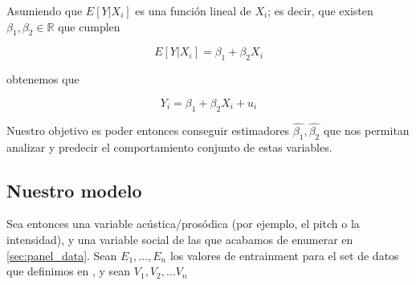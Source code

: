Asumiendo que $E[Y|X_i]$ es una función lineal de $X_i$; es decir, que existen $\beta_1, \beta_2 \in \mathbb{R}$ que cumplen

\begin{equation}
  E[Y|X_i] = \beta_1 + \beta_2 X_i
\end{equation}

obtenemos que

\begin{equation}
  Y_i = \beta_1 + \beta_2 X_i + u_i
\end{equation}

Nuestro objetivo es poder entonces conseguir estimadores $\widehat{\beta_1}, \widehat{\beta_2}$ que nos permitan analizar y predecir el comportamiento conjunto de estas variables.

\subsection{Nuestro modelo}



Sea entonces una variable acústica/prosódica (por ejemplo, el pitch o la intensidad), y una variable social de las que acabamos de enumerar en \ref{sec:panel_data}. Sean $E_1, \ldots, E_n$ los valores de entrainment para el set de datos que definimos en , y sean $V_1, V_2, \ldots V_n$

